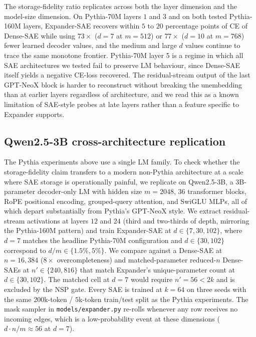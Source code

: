 \documentclass{article}
\theoremstyle{plain}
\theoremstyle{definition}
\theoremstyle{remark}
\begin{document}
The storage-fidelity ratio replicates across both the layer dimension and the model-size dimension. On Pythia-70M layers $1$ and $3$ and on both tested Pythia-160M layers, Expander-SAE recovers within $5$ to $20$ percentage points of CE of Dense-SAE while using $73\times$ ($d{=}7$ at $m{=}512$) or $77\times$ ($d{=}10$ at $m{=}768$) fewer learned decoder values, and the medium and large $d$ values continue to trace the same monotone frontier. Pythia-70M layer 5 is a regime in which all SAE architectures we tested fail to preserve LM behaviour, since Dense-SAE itself yields a negative CE-loss recovered. The residual-stream output of the last GPT-NeoX block is harder to reconstruct without breaking the unembedding than at earlier layers regardless of architecture, and we read this as a known limitation of SAE-style probes at late layers rather than a feature specific to Expander supports.

\subsection{Qwen2.5-3B cross-architecture replication}

The Pythia experiments above use a single LM family. To check whether the storage-fidelity claim transfers to a modern non-Pythia architecture at a scale where SAE storage is operationally painful, we replicate on Qwen2.5-3B, a 3B-parameter decoder-only LM with hidden size $m{=}2048$, $36$ transformer blocks, RoPE positional encoding, grouped-query attention, and SwiGLU MLPs, all of which depart substantially from Pythia's GPT-NeoX style. We extract residual-stream activations at layers $12$ and $24$ (third and two-thirds of depth, mirroring the Pythia-160M pattern) and train Expander-SAE at $d \in \{7, 30, 102\}$, where $d{=}7$ matches the headline Pythia-70M configuration and $d \in \{30, 102\}$ correspond to $d/m \in \{1.5\%, 5\%\}$. We compare against a Dense-SAE at $n{=}16{,}384$ ($8\times$ overcompleteness) and matched-parameter reduced-$n$ Dense-SAEs at $n' \in \{240, 816\}$ that match Expander's unique-parameter count at $d \in \{30, 102\}$. The matched cell at $d{=}7$ would require $n'{=}56 < 2k$ and is excluded by the NSP gate. Every SAE is trained at $k{=}64$ on three seeds with the same $200$k-token / $5$k-token train/test split as the Pythia experiments. The mask sampler in \texttt{models/expander.py} re-rolls whenever any row receives no incoming edges, which is a low-probability event at these dimensions ($d \cdot n / m \approx 56$ at $d{=}7$).
\end{document}
